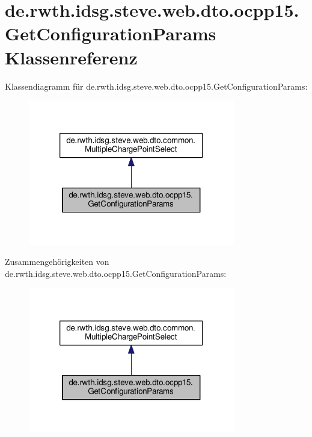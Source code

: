 \hypertarget{classde_1_1rwth_1_1idsg_1_1steve_1_1web_1_1dto_1_1ocpp15_1_1_get_configuration_params}{\section{de.\-rwth.\-idsg.\-steve.\-web.\-dto.\-ocpp15.\-Get\-Configuration\-Params Klassenreferenz}
\label{classde_1_1rwth_1_1idsg_1_1steve_1_1web_1_1dto_1_1ocpp15_1_1_get_configuration_params}
}


Klassendiagramm für de.\-rwth.\-idsg.\-steve.\-web.\-dto.\-ocpp15.\-Get\-Configuration\-Params\-:\nopagebreak
\begin{figure}[H]
\begin{center}
\leavevmode
\includegraphics[width=256pt]{classde_1_1rwth_1_1idsg_1_1steve_1_1web_1_1dto_1_1ocpp15_1_1_get_configuration_params__inherit__graph}
\end{center}
\end{figure}


Zusammengehörigkeiten von de.\-rwth.\-idsg.\-steve.\-web.\-dto.\-ocpp15.\-Get\-Configuration\-Params\-:\nopagebreak
\begin{figure}[H]
\begin{center}
\leavevmode
\includegraphics[width=256pt]{classde_1_1rwth_1_1idsg_1_1steve_1_1web_1_1dto_1_1ocpp15_1_1_get_configuration_params__coll__graph}
\end{center}
\end{figure}
